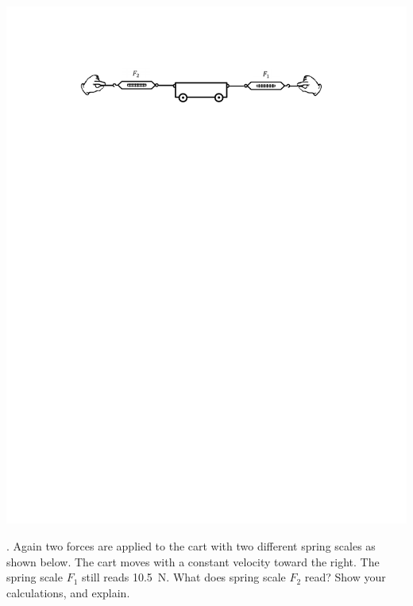 \includegraphics{force_mass/cart_plus_two_scales.pdf}


\answerspace{30mm}

. Again two forces are applied to the cart with two different spring scales
as shown below. The cart moves with a constant velocity toward the right. 
The spring scale \( F_{1} \) still reads 10.5~N.
What does spring scale
\( F_{2} \) read? Show your calculations, and explain.

